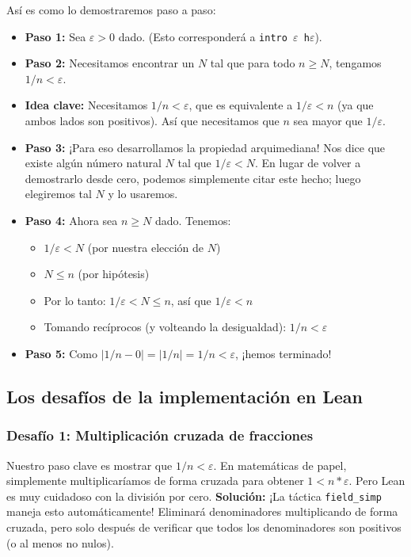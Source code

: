Así es como lo demostraremos paso a paso:
\begin{itemize}
    \item \textbf{Paso 1:} Sea $\varepsilon > 0$ dado. (Esto corresponderá a \texttt{intro $\varepsilon$ h$\varepsilon$}).
    \item \textbf{Paso 2:} Necesitamos encontrar un $N$ tal que para todo $n \ge N$, tengamos $1/n < \varepsilon$.
    \item \textbf{Idea clave:} Necesitamos $1/n < \varepsilon$, que es equivalente a $1/\varepsilon < n$ (ya que ambos lados son positivos). Así que necesitamos que $n$ sea mayor que $1/\varepsilon$.
    \item \textbf{Paso 3:} ¡Para eso desarrollamos la propiedad arquimediana! Nos dice que existe algún número natural $N$ tal que $1/\varepsilon < N$. En lugar de volver a demostrarlo desde cero, podemos simplemente citar este hecho; luego elegiremos tal $N$ y lo usaremos.
    \item \textbf{Paso 4:} Ahora sea $n \ge N$ dado. Tenemos:
    \begin{itemize}
        \item $1/\varepsilon < N$ (por nuestra elección de $N$)
        \item $N \le n$ (por hipótesis)
        \item Por lo tanto: $1/\varepsilon < N \le n$, así que $1/\varepsilon < n$
        \item Tomando recíprocos (y volteando la desigualdad): $1/n < \varepsilon$
    \end{itemize}
    \item \textbf{Paso 5:} Como $|1/n - 0| = |1/n| = 1/n < \varepsilon$, ¡hemos terminado!
\end{itemize}

\subsection{Los desafíos de la implementación en Lean}

\subsubsection{Desafío 1: Multiplicación cruzada de fracciones}
Nuestro paso clave es mostrar que $1/n < \varepsilon$. En matemáticas de papel, simplemente multiplicaríamos de forma cruzada para obtener $1 < n * \varepsilon$. Pero Lean es muy cuidadoso con la división por cero.
\textbf{Solución:} ¡La táctica \texttt{field\_simp} maneja esto automáticamente! Eliminará denominadores multiplicando de forma cruzada, pero solo después de verificar que todos los denominadores son positivos (o al menos no nulos).

